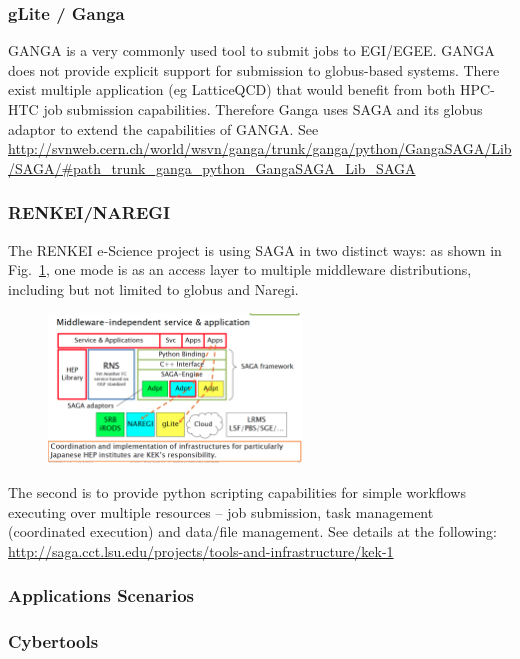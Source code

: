 \documentclass[12pt]{article}
\begin{document}
\subsubsection*{gLite / Ganga} 

GANGA is a very commonly used tool to submit jobs to EGI/EGEE. GANGA
does not provide explicit support for submission to globus-based
systems. There exist multiple application (eg LatticeQCD) that would
benefit from both HPC-HTC job submission capabilities. Therefore Ganga
uses SAGA and its globus adaptor to extend the capabilities of GANGA.
See
\url{http://svnweb.cern.ch/world/wsvn/ganga/trunk/ganga/python/GangaSAGA/Lib/SAGA/#path_trunk_ganga_python_GangaSAGA_Lib_SAGA}

\subsubsection*{RENKEI/NAREGI}

The RENKEI e-Science project is using SAGA in two distinct ways: as
shown in Fig.~\ref{fig:renkei}, one mode is as an access layer to
multiple middleware distributions, including but not limited to globus
and Naregi.
\begin{figure}[t]
      \centering
      \includegraphics[width=0.6\textwidth]{saga-renkei.png}
      \caption{\footnotesize }
      \label{fig:renkei}
\end{figure}
The second is to provide python scripting capabilities for simple
workflows executing over multiple resources -- job submission, task
management (coordinated execution) and data/file management.  See
details at the following:
\url{http://saga.cct.lsu.edu/projects/tools-and-infrastructure/kek-1}





\subsubsection{Applications Scenarios}
\subsubsection*{Cybertools} 
\end{document}
